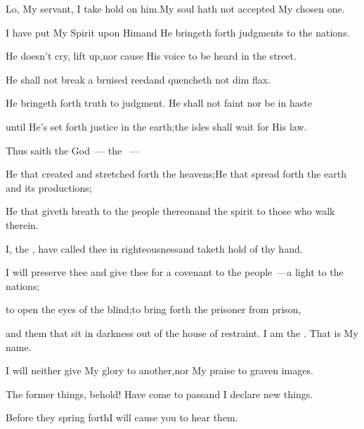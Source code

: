 
\begin{inparaenum}
  \pb{} Lo, My servant, I take hold on him.\pa{}My soul hath not accepted My chosen one.%

  \pb{}I have put My Spirit upon Him\pa{}and He bringeth forth judgments to the nations.%

  \pb{} He doesn't cry, lift up,\pa{}nor cause His voice to be heard in the street.%

  \pb{} He shall not break a bruised reed\pa{}and quencheth not dim flax.%

  \pb{}He bringeth forth truth to judgment.  He shall not faint nor be in haste%

  \pb{}until He's set forth justice in the earth;\pa{}the isles shall wait for His law.%

  \pb{} Thus saith the God~--- the \lord~---%

  \pb{}He that created and stretched forth the heavens;\pa{}He that spread forth the earth and its productions;%

  \pb{}He that giveth breath to the people thereon\pa{}and the spirit to those who walk therein.%

  \pb{} I, the \lord, have called thee in righteousness\pa{}and taketh hold of thy hand.%

  \pb{}I will preserve thee and give thee for a covenant to the people~---\pa{}a light to the nations;%

  \pb{} to open the eyes of the blind;\pa{}to bring forth the prisoner from prison,%

  \pb{}and them that sit in darkness out of the house of restraint.  I am the \lord. That is My name.%

  \pb{}I will neither give My glory to another,\pa{}nor My praise to graven images.%

  \pb{} The former things, behold! Have come to pass\pa{}and I declare new things.%

  \pb{}Before they spring forth\pa{}I will cause you to hear them.%
\end{inparaenum}
